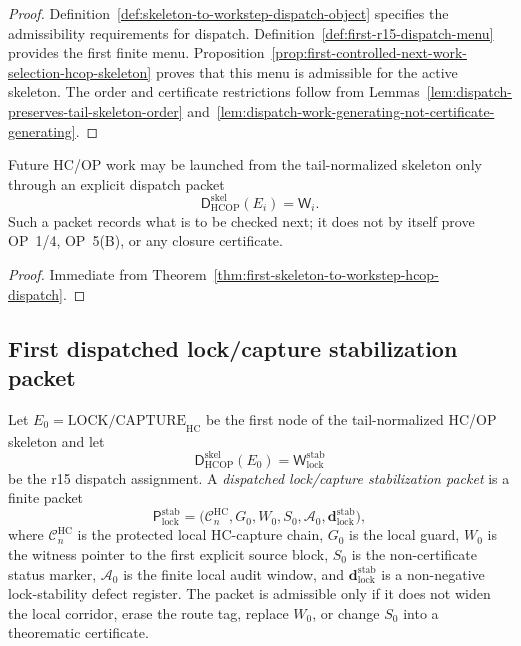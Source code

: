 \begin{proof}
Definition~\ref{def:skeleton-to-workstep-dispatch-object} specifies the admissibility requirements for dispatch. Definition~\ref{def:first-r15-dispatch-menu} provides the first finite menu. Proposition~\ref{prop:first-controlled-next-work-selection-hcop-skeleton} proves that this menu is admissible for the active skeleton. The order and certificate restrictions follow from Lemmas~\ref{lem:dispatch-preserves-tail-skeleton-order} and~\ref{lem:dispatch-work-generating-not-certificate-generating}.
\end{proof}

\begin{corollary}
\label{cor:v3340-r15-working-rule}
Future HC/OP work may be launched from the tail-normalized skeleton only through an explicit dispatch packet
\[
  \mathsf D_{\mathrm{HCOP}}^{\mathrm{skel}}(E_i)=\mathsf W_i .
\]
Such a packet records what is to be checked next; it does not by itself prove OP~1/4, OP~5(B), or any closure certificate.
\end{corollary}

\begin{proof}
Immediate from Theorem~\ref{thm:first-skeleton-to-workstep-hcop-dispatch}.
\end{proof}


\subsection{First dispatched lock/capture stabilization packet}
\label{subsec:first-dispatched-lock-capture-stabilization-packet}

\begin{definition}
\label{def:dispatched-lock-capture-stabilization-packet}
Let \(E_0=\mathrm{LOCK/CAPTURE}_{\mathrm{HC}}\) be the first node of the tail-normalized HC/OP skeleton and let
\[
  \mathsf D_{\mathrm{HCOP}}^{\mathrm{skel}}(E_0)
  =
  \mathsf W_{\mathrm{lock}}^{\mathrm{stab}}
\]
be the r15 dispatch assignment.  A \emph{dispatched lock/capture stabilization packet} is a finite packet
\[
  \mathsf P_{\mathrm{lock}}^{\mathrm{stab}}
  =
  \bigl(\mathcal C_n^{\mathrm{HC}},G_0,W_0,S_0,\mathcal A_0,\mathbf d_{\mathrm{lock}}^{\mathrm{stab}}\bigr),
\]
where \(\mathcal C_n^{\mathrm{HC}}\) is the protected local HC-capture chain, \(G_0\) is the local guard, \(W_0\) is the witness pointer to the first explicit source block, \(S_0\) is the non-certificate status marker, \(\mathcal A_0\) is the finite local audit window, and \(\mathbf d_{\mathrm{lock}}^{\mathrm{stab}}\) is a non-negative lock-stability defect register.  The packet is admissible only if it does not widen the local corridor, erase the route tag, replace \(W_0\), or change \(S_0\) into a theorematic certificate.
\end{definition}

